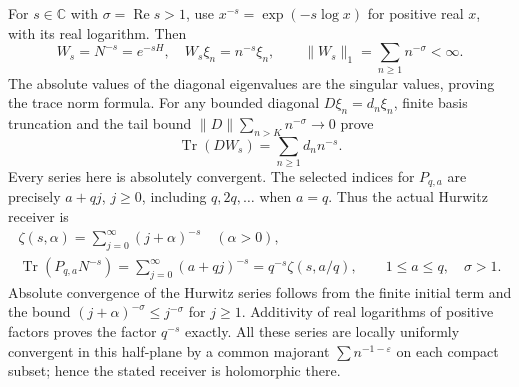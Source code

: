 For $s\in\mathbb C$ with $\sigma=\operatorname{Re}s>1$,
use $x^{-s}=\exp(-s\log x)$ for positive real $x$, with
its real logarithm. Then
\begin{equation}\tag{HCR26}
 W_s=N^{-s}=e^{-sH},\quad W_s\xi_n=n^{-s}\xi_n,
 \qquad \|W_s\|_1=\sum_{n\ge1}n^{-\sigma}<\infty.
\end{equation}
The absolute values of the diagonal eigenvalues are
the singular values, proving the trace norm formula.
For any bounded diagonal $D\xi_n=d_n\xi_n$, finite
basis truncation and the tail bound
$\|D\|\sum_{n>K}n^{-\sigma}\to0$ prove
\begin{equation}\tag{HCR27}
 \operatorname{Tr}(DW_s)=\sum_{n\ge1}d_nn^{-s}.
\end{equation}
Every series here is absolutely convergent. The selected
indices for $P_{q,a}$ are precisely $a+qj$, $j\ge0$,
including $q,2q,\ldots$ when $a=q$. Thus the actual
Hurwitz receiver is
\begin{equation}\tag{HCR28}
\boxed{\begin{gathered}
 \zeta(s,\alpha)=\sum_{j=0}^\infty(j+\alpha)^{-s}\quad(\alpha>0),\\
 \operatorname{Tr}(P_{q,a}N^{-s})
  =\sum_{j=0}^\infty(a+qj)^{-s}
  =q^{-s}\zeta(s,a/q),\qquad 1\le a\le q,\quad\sigma>1.
\end{gathered}}
\end{equation}
Absolute convergence of the Hurwitz series follows from
the finite initial term and the bound $(j+\alpha)^{-\sigma}
\le j^{-\sigma}$ for $j\ge1$. Additivity of real logarithms
of positive factors proves the factor $q^{-s}$ exactly.
All these series are locally uniformly convergent in this
half-plane by a common majorant $\sum n^{-1-\varepsilon}$
on each compact subset; hence the stated receiver is
holomorphic there.

